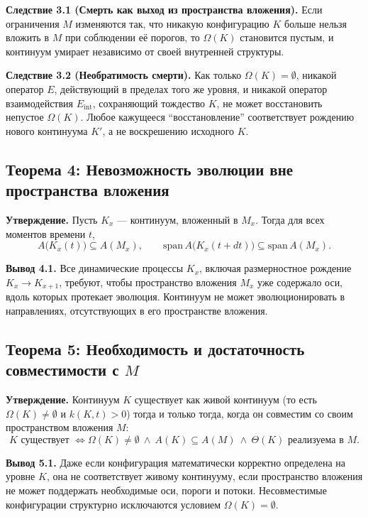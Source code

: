 \textbf{Следствие 3.1 (Смерть как выход из пространства вложения).}
Если ограничения \(M\) изменяются так, что никакую конфигурацию \(K\) больше нельзя вложить в \(M\) при соблюдении её порогов, то \(\Omega(K)\) становится пустым, и континуум умирает независимо от своей внутренней структуры.

\textbf{Следствие 3.2 (Необратимость смерти).}
Как только \(\Omega(K) = \emptyset\), никакой оператор \(E\), действующий в пределах того же уровня, и никакой оператор взаимодействия \(E_{\mathrm{int}}\), сохраняющий тождество \(K\), не может восстановить непустое \(\Omega(K)\).
Любое кажущееся ``восстановление'' соответствует рождению нового континуума \(K'\), а не воскрешению исходного \(K\).

\subsection{Теорема 4: Невозможность эволюции вне пространства вложения}

\textbf{Утверждение.}
Пусть \(K_x\) --- континуум, вложенный в \(M_x\).
Тогда для всех моментов времени \(t\),
\[
    A\big(K_x(t)\big) \subseteq A(M_x),
    \qquad
    \mathrm{span}\,A\big(K_x(t+dt)\big) \subseteq \mathrm{span}\,A(M_x).
\]

\textbf{Вывод 4.1.}
Все динамические процессы \(K_x\), включая размерностное рождение \(K_x \to K_{x+1}\), требуют, чтобы пространство вложения \(M_x\) уже содержало оси, вдоль которых протекает эволюция.
Континуум не может эволюционировать в направлениях, отсутствующих в его пространстве вложения.

\subsection{Теорема 5: Необходимость и достаточность совместимости с \texorpdfstring{$M$}{M}}

\textbf{Утверждение.}
Континуум \(K\) существует как живой континуум (то есть \(\Omega(K)\neq\emptyset\) и \(k(K,t)>0\)) тогда и только тогда, когда он совместим со своим пространством вложения \(M\):
\[
    K \text{ существует }
    \Longleftrightarrow
    \Omega(K) \neq \emptyset
    \ \wedge\
    A(K) \subseteq A(M)
    \ \wedge\
    \Theta(K) \text{ реализуема в } M.
\]

\textbf{Вывод 5.1.}
Даже если конфигурация математически корректно определена на уровне \(K\), она не соответствует живому континууму, если пространство вложения не может поддержать необходимые оси, пороги и потоки.
Несовместимые конфигурации структурно исключаются условием \(\Omega(K) = \emptyset\).

